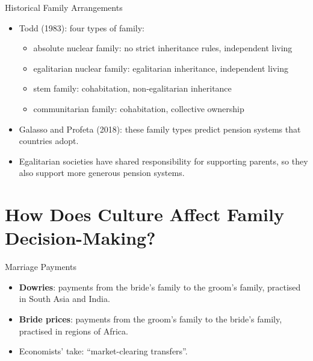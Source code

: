 \documentclass[11pt,notes=hide,aspectratio=169,mathserif]{beamer}
\begin{document}
\begin{frame}{Historical Family Arrangements}
\begin{itemize}
  \item Todd (1983): four types of family:
  \begin{itemize}
    \item absolute nuclear family: no strict inheritance rules, independent living
    \item egalitarian nuclear family: egalitarian inheritance, independent living
    \item stem family: cohabitation, non-egalitarian inheritance
    \item communitarian family: cohabitation, collective ownership
  \end{itemize}
  \item Galasso and Profeta (2018): these family types predict pension systems that countries adopt.
  \item Egalitarian societies have shared responsibility for supporting parents, so they also support more generous pension systems.
\end{itemize}
\end{frame}

\section{How Does Culture Affect Family Decision-Making?}
\begin{frame}{Marriage Payments}
\begin{itemize}
  \item \textbf{Dowries}: payments from the bride's family to the groom's family, practised in South Asia and India.
  \item \textbf{Bride prices}: payments from the groom's family to the bride's family, practised in regions of Africa.
  \item Economists' take: “market-clearing transfers”.
\end{itemize}
\end{frame}
\end{document}
